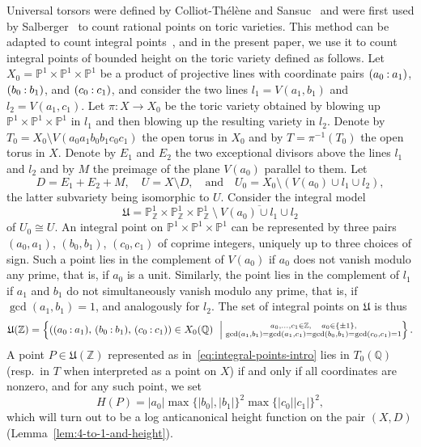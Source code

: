 \documentclass[a4paper, twoside, 10pt]{amsart}
\newcommand{\pc}[1]{%
  \begingroup\lccode`~=`: \lowercase{\endgroup
  \edef~}{\mathbin{\mathchar\the\mathcode`:}\nobreak}%
  (%
  \begingroup
  \mathcode`:=\string"8000
  #1%
  \endgroup
  )%
}
\newcommand{\mU}{\mathfrak{U}}
\newcommand{\PP}{\mathbb{P}}
\newcommand{\ZZ}{\mathbb{Z}}
\newcommand{\QQ}{\mathbb{Q}}
\newcommand{\abs}[1]{\left\lvert#1\right\rvert}
\newcommand{\relmiddle}[1]{\mathrel{}\middle#1\mathrel{}}
\theoremstyle{definition}
\begin{document}
Universal torsors were defined by Colliot-Thélène and Sansuc~\cite{MR899402} and were first used by Salberger~\cite{MR1679841} to count rational points on toric varieties. This method can be adapted to count integral points~\cite{arXiv:1901.08503}, and in the present paper, we use it to count
integral points of bounded height on the toric variety defined as follows. Let $X_0 = \PP^1\times \PP^1 \times \PP^1$ be a product of projective lines with coordinate pairs $\pc{a_0:a_1}$, $\pc{b_0:b_1}$, and $\pc{c_0:c_1}$, and consider the two lines $l_1 = V(a_1,b_1)$ and $l_2=V(a_1,c_1)$. Let $\pi \colon X\to X_0$ be the toric variety obtained by blowing up $\PP^1\times \PP^1 \times \PP^1$ in $l_1$ and then blowing up the resulting variety in $l_2$. Denote by $T_0 = X_0 \setminus V(a_0a_1b_0b_1c_0c_1)$ the open torus in $X_0$ and by $T=\pi^{-1}(T_0)$ the open torus in $X$. Denote by $E_1$ and $E_2$ the two exceptional divisors above the lines $l_1$ and $l_2$ and by $M$ the preimage of the plane $V(a_0)$ parallel to them. Let
\[
  D=E_1+E_2+M, \quad U=X \setminus D,\quad\text{and}\quad  U_0 = X_0 \setminus (V(a_0)\cup l_1\cup l_2),
\]
the latter subvariety being isomorphic to $U$.
Consider the integral model
\[
  \mU = \PP^1_\ZZ \times \PP^1_\ZZ \times \PP^1_\ZZ \ \setminus \ 
  \overline{V(a_0)\cup l_1\cup l_2}
\]
of $U_0 \cong U$. An integral point on $\PP^1\times \PP^1\times \PP^1$ can be represented by three pairs $(a_0,a_1)$, $(b_0,b_1)$, $(c_0,c_1)$ of coprime integers, uniquely up to three choices of sign. Such a point lies in the complement of $V(a_0)$ if $a_0$ does not vanish modulo any prime, that is, if $a_0$ is a unit. Similarly, the point lies in the complement of $l_1$ if $a_1$ and $b_1$ do not simultaneously vanish modulo any prime, that is, if $\gcd(a_1,b_1)=1$, and analogously for $l_2$. The set of integral points on $\mU$ is thus
\begin{equation}\label{eq:integral-points-intro}
  \mU(\ZZ) = \left\{ \left(\pc{a_0:a_1},\, \pc{b_0:b_1},\, \pc{c_0:c_1}\right)\in X_0(\QQ) \ \relmiddle| 
  \substack{
    a_0,\dots,c_1\in \ZZ, \quad a_0\in\{\pm 1\}, \\
    \gcd(a_1,b_1)=\gcd(a_1,c_1)=\gcd(b_0,b_1)=\gcd(c_0,c_1)=1
  }
  \right\}.
\end{equation}
A point $P\in \mU(\ZZ)$ represented as in~\eqref{eq:integral-points-intro} lies in $T_0(\QQ)$ (resp.~in $T$ when interpreted as a point on $X$) if and only if all coordinates are nonzero, and for any such point, we set
\[
  H(P) = \abs{a_0}\max\{\abs{b_0},\abs{b_1}\}^2\max\{\abs{c_0}\abs{c_1}\}^2,
\]
which will turn out to be a log anticanonical height function on the pair $(X,D)$ (Lemma~\ref{lem:4-to-1-and-height}).
\end{document}
